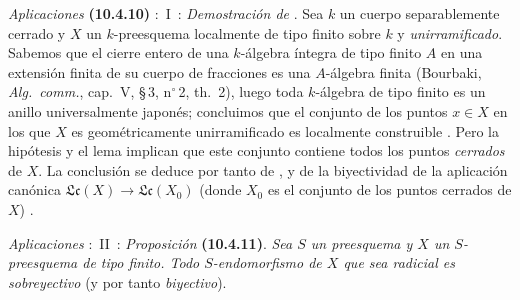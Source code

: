 \begin{env}[10.4.10]
\label{IV.10.4.10}
\emph{Aplicaciones} \textbf{(10.4.10)} :~I~: \emph{Demostración de} .
Sea $k$ un cuerpo separablemente cerrado y $X$ un $k$-preesquema localmente de tipo finito sobre $k$ y \emph{unirramificado}.
Sabemos que el cierre entero de una $k$-álgebra íntegra de tipo finito $A$ en una extensión finita de su cuerpo de fracciones es una $A$-álgebra finita (Bourbaki, \emph{Alg.\ comm.}, cap.~V, \S\,3, n$^\circ$\,2, th.~2), luego toda $k$-álgebra de tipo finito es un anillo universalmente japonés; concluimos que el conjunto de los puntos $x\in X$ en los que $X$ es geométricamente unirramificado es localmente construible .
Pero la hipótesis y el lema  implican que este conjunto contiene todos los puntos \emph{cerrados} de $X$.
La conclusión se deduce por tanto de ,  y de la biyectividad de la aplicación canónica $\mathfrak{Lc}(X)\to\mathfrak{Lc}(X_0)$ (donde $X_0$ es el conjunto de los puntos cerrados de $X$) .
\end{env}

\begin{env}[10.4.11]
\label{IV.10.4.11}
\emph{Aplicaciones} :~II~: \emph{Proposición} \textbf{(10.4.11)}.
\emph{Sea $S$ un preesquema y $X$ un $S$-preesquema de tipo finito.
Todo $S$-endomorfismo de $X$ que sea radicial es sobreyectivo} (y por tanto \emph{biyectivo}).
\end{env}


